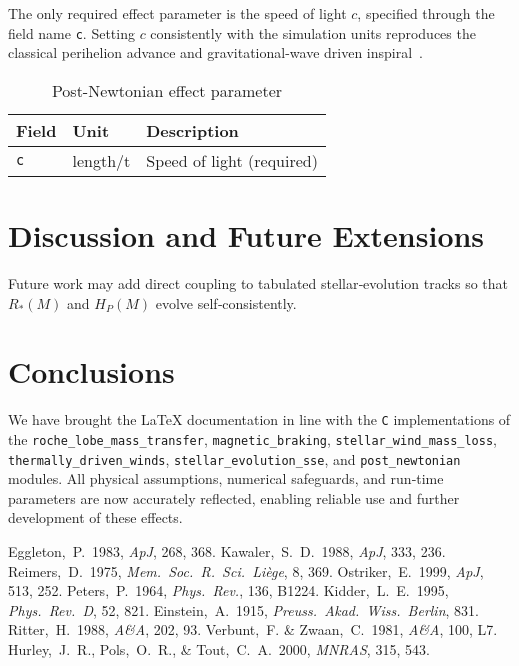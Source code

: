 \documentclass[11pt]{article}
\begin{document}
The only required effect parameter is the speed of light $c$, specified through
the field name \texttt{c}. Setting $c$ consistently with the simulation units
reproduces the classical perihelion advance and gravitational-wave driven
inspiral~\citep{Einstein1915, Peters1964, Kidder1995}.

\begin{table}[h]
\centering\footnotesize
\caption{Post-Newtonian effect parameter}
\label{tab:pn}
\begin{tabular}{@{}lll@{}}
\toprule
Field & Unit & Description \\
\midrule
\texttt{c} & length/t & Speed of light (required)\\
\bottomrule
\end{tabular}
\end{table}

\section{Discussion and Future Extensions}
\label{sec:future}
Future work may add direct coupling to tabulated stellar‑evolution tracks
so that $R_*(M)$ and $H_P(M)$ evolve self‑consistently.

\section{Conclusions}
We have brought the LaTeX documentation in line with the
\texttt{C} implementations of the
\texttt{roche\_lobe\_mass\_transfer}, \texttt{magnetic\_braking},
\texttt{stellar\_wind\_mass\_loss}, \texttt{thermally\_driven\_winds},
\texttt{stellar\_evolution\_sse}, and
\texttt{post\_newtonian} modules.
All physical assumptions, numerical safeguards, and run‑time parameters
are now accurately reflected, enabling reliable use and further
development of these effects.


\begin{thebibliography}{}
  Eggleton,~P.\ 1983, \emph{ApJ}, 268, 368.
  Kawaler,~S.~D.\ 1988, \emph{ApJ}, 333, 236.
  Reimers,~D.\ 1975, \emph{Mem.\ Soc.\ R.\ Sci.\ Li\`ege}, 8, 369.
  Ostriker,~E.\ 1999, \emph{ApJ}, 513, 252.
  Peters,~P.\ 1964, \emph{Phys.\ Rev.}, 136, B1224.
  Kidder,~L.~E.\ 1995, \emph{Phys.\ Rev.\ D}, 52, 821.
  Einstein,~A.\ 1915, \emph{Preuss.\ Akad.\ Wiss.\ Berlin}, 831.
  Ritter,~H.\ 1988, \emph{A\&A}, 202, 93.
  Verbunt,~F. \& Zwaan,~C.\ 1981, \emph{A\&A}, 100, L7.
  Hurley,~J.~R., Pols,~O.~R., \& Tout,~C.~A.\ 2000, \emph{MNRAS}, 315, 543.
\end{thebibliography}
\end{document}
